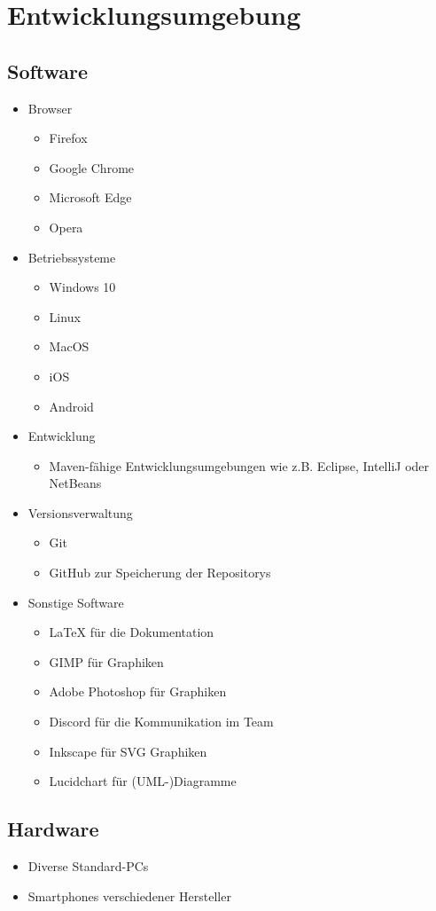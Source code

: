 \section{Entwicklungsumgebung}
\subsection{Software}
\begin{itemize}
    \item Browser
    \begin{itemize} [noitemsep]
        \item Firefox
        \item Google Chrome
        \item Microsoft Edge
        \item Opera
    \end{itemize} 
    \item Betriebssysteme
    \begin{itemize} [noitemsep]
        \item Windows 10
        \item Linux
        \item MacOS
        \item iOS
        \item Android
    \end{itemize}
    \item Entwicklung
    \begin{itemize} [noitemsep]
        \item \gls{Maven}-fähige Entwicklungsumgebungen wie z.B. \gls{Eclipse}, \gls{IntelliJ} oder \gls{NetBeans}
    \end{itemize}
    \item Versionsverwaltung
    \begin{itemize} [noitemsep]
        \item \gls{Git}
        \item \gls{GitHub} zur Speicherung der \glspl{Repository}
    \end{itemize}
    \item Sonstige Software
    \begin{itemize} [noitemsep]
        \item \LaTeX \hspace{0.05cm} für die Dokumentation
        \item GIMP für Graphiken
        \item Adobe Photoshop für Graphiken
        \item Discord für die Kommunikation im Team
        \item Inkscape für SVG Graphiken
        \item Lucidchart für (\gls{UML}-)Diagramme
    \end{itemize}
\end{itemize}
\clearpage
\subsection{Hardware}
\begin{itemize} [noitemsep]
    \item Diverse \glspl{Standard-PC}
    \item \glspl{Smartphone} verschiedener Hersteller
\end{itemize}
